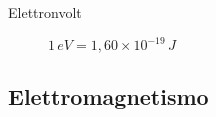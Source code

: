 \documentclass[a4paper,11pt,italian]{article}
\begin{document}
\begin{description}
%
%   
%   
   
  \item[Elettronvolt] 
  $ 1 \, eV = 1,60 \times 10^{-19} \, J $
\end{description}



\subsection{Elettromagnetismo}
\end{document}
